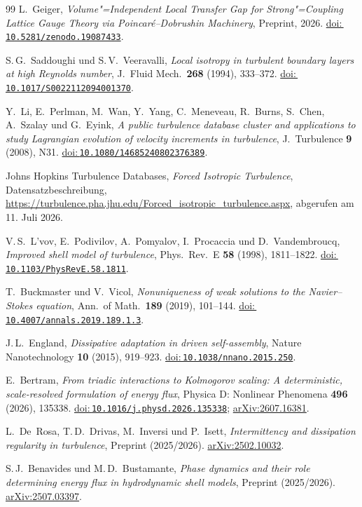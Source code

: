 \documentclass[12pt,a4paper]{article}
\newcommand{\doilink}[1]{\href{https://doi.org/#1}{doi:\,\nolinkurl{#1}}}
\theoremstyle{breakdef}
\theoremstyle{breakplain}
\theoremstyle{breakdef}
\begin{document}
\begin{thebibliography}{99}
L.~Geiger, \textit{Volume"=Independent Local Transfer Gap for Strong"=Coupling Lattice Gauge Theory via Poincaré--Dobrushin Machinery}, Preprint, 2026.
\doilink{10.5281/zenodo.19087433}.

S.\,G.~Saddoughi und S.\,V.~Veeravalli,
\emph{Local isotropy in turbulent boundary layers at high Reynolds number},
J.~Fluid Mech.\ \textbf{268} (1994), 333--372.
\doilink{10.1017/S0022112094001370}.

Y.~Li, E.~Perlman, M.~Wan, Y.~Yang, C.~Meneveau, R.~Burns, S.~Chen,
A.~Szalay und G.~Eyink,
\emph{A public turbulence database cluster and applications to study
Lagrangian evolution of velocity increments in turbulence},
J.~Turbulence \textbf{9} (2008), N31.
\doilink{10.1080/14685240802376389}.

Johns Hopkins Turbulence Databases,
\emph{Forced Isotropic Turbulence}, Datensatzbeschreibung,
\url{https://turbulence.pha.jhu.edu/Forced_isotropic_turbulence.aspx},
abgerufen am 11. Juli 2026.

V.\,S.~L'vov, E.~Podivilov, A.~Pomyalov, I.~Procaccia
und D.~Vandembroucq,
\emph{Improved shell model of turbulence},
Phys.\ Rev.\ E \textbf{58} (1998), 1811--1822.
\doilink{10.1103/PhysRevE.58.1811}.

T.~Buckmaster und V.~Vicol,
\emph{Nonuniqueness of weak solutions to the Navier--Stokes equation},
Ann.\ of Math.\ \textbf{189} (2019), 101--144.
\doilink{10.4007/annals.2019.189.1.3}.

J.\,L.~England,
\emph{Dissipative adaptation in driven self-assembly},
Nature Nanotechnology \textbf{10} (2015), 919--923.
\doilink{10.1038/nnano.2015.250}.


E.~Bertram,
\emph{From triadic interactions to Kolmogorov scaling: A deterministic, scale-resolved formulation of energy flux},
Physica D: Nonlinear Phenomena \textbf{496} (2026), 135338.
\doilink{10.1016/j.physd.2026.135338};
\href{https://arxiv.org/abs/2607.16381}{arXiv:2607.16381}.

L.~De~Rosa, T.\,D.~Drivas, M.~Inversi und P.~Isett,
\emph{Intermittency and dissipation regularity in turbulence},
Preprint (2025/2026).
\href{https://arxiv.org/abs/2502.10032}{arXiv:2502.10032}.

S.\,J.~Benavides und M.\,D.~Bustamante,
\emph{Phase dynamics and their role determining energy flux in hydrodynamic shell models},
Preprint (2025/2026).
\href{https://arxiv.org/abs/2507.03397}{arXiv:2507.03397}.


\end{thebibliography}
\end{document}
